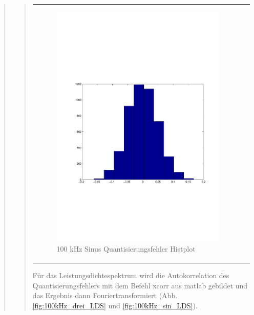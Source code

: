 \begin{quote}
\begin{quote}
\begin{center}
\begin{tabular}{ll}
                \begin{minipage}{0.6\textwidth}
                    \begin{figure}[H]
                        \includegraphics[scale=0.55, trim = 16mm 70mm 16mm 85mm, clip]{Bilder/100kHz_sin_Quant_Hist}
                       \caption{100 kHz Sinus Quantisierungsfehler Histplot}
		              \label{fig:100kHz_sin_Hist}
                    \end{figure}
                \end{minipage}
            
            \end{tabular}
        \end{center}
            
        \vspace{2em}
	   	
	   	
	   	Für das Leistungsdichtespektrum wird die Autokorrelation des Quantisierungsfehlers mit dem Befehl xcorr aus matlab
	   	gebildet und das Ergebnis dann Fouriertransformiert (Abb. \ref{fig:100kHz_drei_LDS} und
	   	\ref{fig:100kHz_sin_LDS}).
	   	

\end{quote}
\end{quote}
